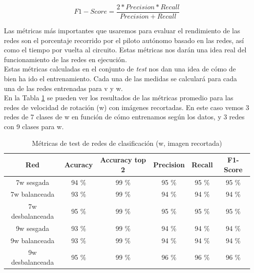 \[F1-Score =  \frac{2 * Precision * Recall}{Precision + Recall} \]
\vspace{10pt}

Las métricas más importantes que usaremos para evaluar el rendimiento de las redes son el porcentaje recorrido por el piloto autónomo basado en las redes, así como el tiempo por vuelta al circuito. Estas métricas nos darán una idea real del funcionamiento de las redes en ejecución.\\

Estas métricas calculadas en el conjunto de \textit{test} nos dan una idea de cómo de bien ha ido el entrenamiento. Cada una de las medidas se calculará para cada una de las redes entrenadas para v y w.\\

En la Tabla \ref{metricas_classificacion_recortada_w} se pueden ver los resultados de las métricas promedio para las redes de velocidad de rotación (w) con imágenes recortadas. En este caso vemos 3 redes de 7 clases de w en función de cómo entrenamos según los datos, y 3 redes con 9 clases para w.\\


\begin{table}[H]
\centering
\caption{Métricas de test de redes de clasificación (w, imagen recortada)}
\label{metricas_classificacion_recortada_w}
\begin{tabular}{c|c|c|c|c|c|}
\cline{1-6}
                        \multicolumn{1}{|c|}{Red}    & Acuracy       & Accuracy top 2      & Precision       & Recall        & F1-Score        \\ \hline
\multicolumn{1}{|c|}{7w sesgada}    & 94 \%             & 99 \%         & 95 \%            & 95 \%          & 95 \%       \\ \hline
\multicolumn{1}{|c|}{7w balanceada}     & 93 \%             & 99 \%          &  94 \%              &  94 \%            &  94 \%             \\ \hline
\multicolumn{1}{|c|}{7w desbalanceada}      &  95 \%             & 99 \%           &  95 \%            & 95 \%        &  95 \%            \\ \hline
\multicolumn{1}{|c|}{9w sesgada}       &  93 \%     &  99 \%      &  94 \%           &  94 \%            &  94 \%               \\ \hline
\multicolumn{1}{|c|}{9w balanceada}      &  93 \%         &  99 \%        &  94 \%         &  94 \%      &  94 \%          \\ \hline
\multicolumn{1}{|c|}{9w desbalanceada}     & 95 \%          & 99 \%        & 96 \%           & 96 \%         & 96 \%                \\ \hline
\end{tabular}
\end{table}

